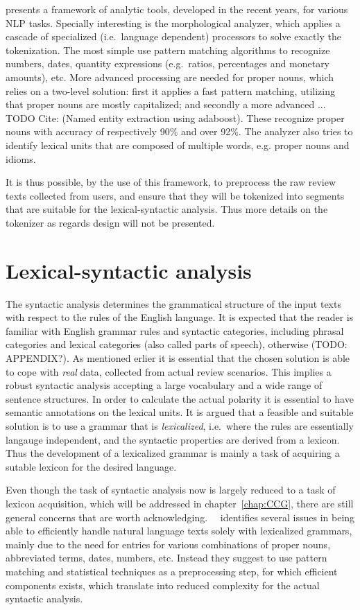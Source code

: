 \citeauthor{freeLing}  presents a framework of analytic tools, developed in the recent years, for various NLP tasks. Specially interesting is the morphological analyzer, which applies a cascade of specialized (i.e.\ language dependent) processors to solve exactly the tokenization. The most simple use pattern matching algorithms to recognize numbers, dates, quantity expressions (e.g.\ ratios, percentages and monetary amounts), etc. More advanced processing are needed for proper nouns, which relies on a two-level solution: first it applies a fast pattern matching, utilizing that proper nouns are mostly capitalized; and secondly a more advanced ... TODO Cite: (Named entity extraction using adaboost). These recognize proper nouns with accuracy of respectively 90\% and over 92\%. The analyzer also tries to identify lexical units that are composed of multiple words, e.g. proper nouns and idioms.

It is thus possible, by the use of this framework, to preprocess the raw review texts collected from users, and ensure that they will be tokenized into segments that are suitable for the lexical-syntactic analysis. Thus more details on the tokenizer as regards design will not be presented.

\section{Lexical-syntactic analysis}
\label{sec:syntacticAnalysis}
The syntactic analysis determines the grammatical structure of the input texts with respect to the rules of the English language. It is expected that the reader is familiar with English grammar rules and syntactic categories, including phrasal categories and lexical categories (also called parts of speech), otherwise (TODO: APPENDIX?). As mentioned erlier it is essential that the chosen solution is able to cope with \emph{real} data, collected from actual review scenarios. This implies a robust syntactic analysis accepting a large vocabulary and a wide range of sentence structures. In order to calculate the actual polarity it is essential to have semantic annotations on the lexical units. It is argued that a feasible and suitable solution is to use a grammar that is \emph{lexicalized}, i.e.\ where the rules are essentially langauge independent, and the syntactic properties are derived from a lexicon. Thus the development of a lexicalized grammar is mainly a task of acquiring a sutable lexicon for the desired language.

Even though the task of syntactic analysis now is largely reduced to a task of lexicon acquisition, which will be addressed in chapter~\ref{chap:CCG}, there are still general concerns that are worth acknowledging. \citeauthor{extendingCCG}~\ identifies several issues in being able to efficiently handle natural language texts solely with lexicalized grammars, mainly due to the need for entries for various combinations of proper nouns, abbreviated terms, dates, numbers, etc. Instead they suggest to use pattern matching and statistical techniques as a preprocessing step, for which efficient components exists, which translate into reduced complexity for the actual syntactic analysis.

